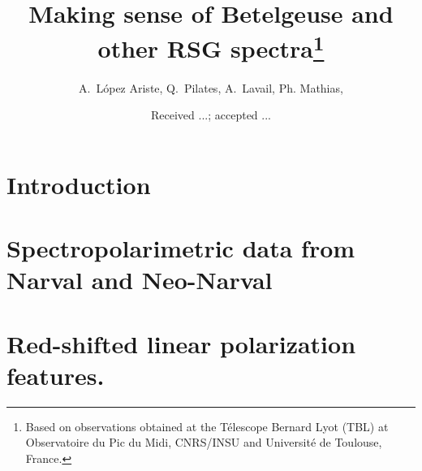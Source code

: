 \documentclass{/Users/art2/TeX/aanda/aa}
\begin{document}
 


   \title{Making sense of Betelgeuse and other RSG spectra\thanks{Based on observations obtained at the T\'elescope Bernard Lyot
(TBL) at Observatoire du Pic du Midi, CNRS/INSU and Universit\'e de
Toulouse, France.}}

   \author{{ A.~L{\'o}pez Ariste}, { Q.~Pilates},{ A.~Lavail},{ Ph. Mathias},  }
   \date{Received ...; accepted ...}

   

 
  \abstract
  {}
   {}
   {}
   { }
   {}
  
   \keywords{}


   \maketitle
%

\section{Introduction}


\section{Spectropolarimetric data from  Narval and Neo-Narval}
 


\section{Red-shifted linear polarization features.}
\end{document}
